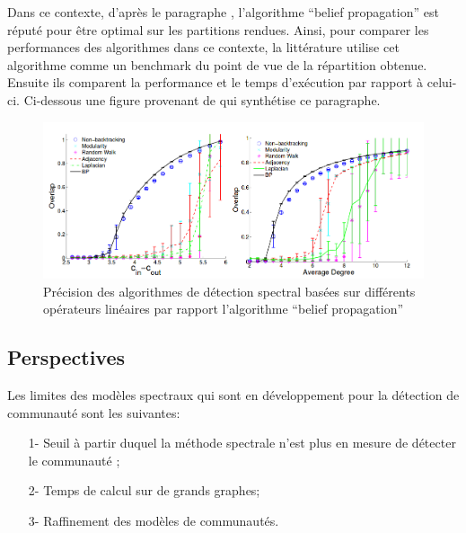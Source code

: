 Dans ce contexte, d'après le paragraphe \cite[Numerical results]{Spectral_Detection_in_the_Censored_Block_Model}, l'algorithme ``belief propagation'' est réputé pour être optimal sur les partitions rendues.
Ainsi, pour comparer les performances des algorithmes dans ce contexte, la littérature utilise cet algorithme comme un benchmark du point de vue de la répartition obtenue.
Ensuite ils comparent la performance et le temps d’exécution par rapport à celui-ci.
Ci-dessous une figure provenant de \cite{Spectral_redemption_clustering_sparse_networks} qui synthétise ce paragraphe.
\begin{figure}[H]
\centering
\includegraphics[scale=0.5]{static/bp_perf.png}
\caption{Précision des algorithmes de détection spectral basées sur différents opérateurs linéaires par rapport l'algorithme ``belief propagation''}
\end{figure}

\subsection{Perspectives}
Les limites des modèles spectraux qui sont en développement pour la détection de communauté sont les suivantes:
\begin{itemize}
	\item[1-] Seuil à partir duquel la méthode spectrale n'est plus en mesure de détecter le communauté ;  
	\item[2-] Temps de calcul sur de grands graphes;  
	\item[3-] Raffinement des modèles de communautés.  
\end{itemize}